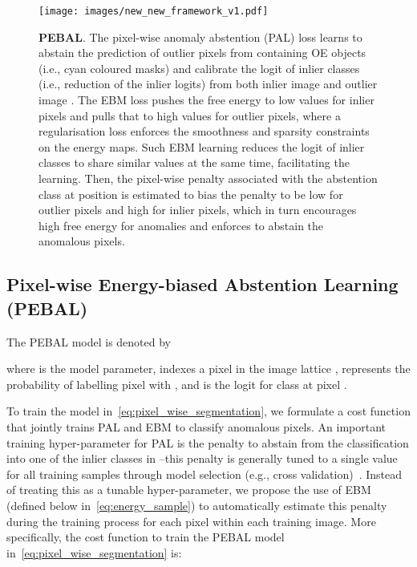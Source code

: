\documentclass[runningheads]{llncs}
\begin{document}
\begin{figure*}[ht!]
    \centering
    \texttt{[image: images/new\_new\_framework\_v1.pdf]}
    \vspace{-8pt}
    \caption{\textbf{PEBAL}. The pixel-wise anomaly abstention (PAL) loss  learns to abstain the prediction of outlier pixels from  containing OE objects (i.e., cyan coloured masks) and calibrate the logit of inlier classes (i.e., reduction of the inlier logits) from both inlier image  and outlier image . The EBM loss  pushes the free energy  to low values for inlier pixels and pulls that to high values for outlier pixels, where a regularisation loss  enforces the smoothness and sparsity constraints on the energy maps. Such EBM learning reduces the logit of inlier classes to share similar values at the same time, facilitating the  learning. 
    Then, the pixel-wise penalty  associated with the abstention class at position  is estimated to bias the penalty to be low for outlier pixels and high for inlier pixels, which in turn encourages
high free energy for anomalies and enforces  to abstain the anomalous pixels.}
    \label{fig:model}
    \vspace{-10pt}
\end{figure*}


\vspace{-10pt}
\subsection{Pixel-wise Energy-biased Abstention Learning (PEBAL)}

The PEBAL model is denoted by

where  is the model parameter,
 indexes a pixel in the image lattice ,  represents the probability of labelling pixel  with , and  is the logit for class  at pixel .





To train the model in~\eqref{eq:pixel_wise_segmentation}, we formulate a cost function that jointly trains PAL and EBM to classify anomalous pixels.
An important training hyper-parameter for PAL is the penalty to abstain from the classification into one of the inlier classes in --this penalty is generally tuned to a single value for all training samples through model selection (e.g., cross validation)~\cite{liu2019deep}. 
Instead of treating this as a tunable hyper-parameter, we propose the use of EBM (defined below in~\eqref{eq:energy_sample}) to automatically estimate this penalty during the training process for each pixel within each training image.
More specifically, the cost function to train the PEBAL model in~\eqref{eq:pixel_wise_segmentation} is:
\end{document}
